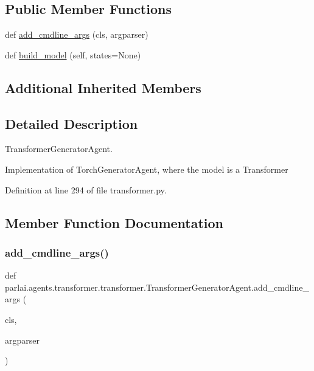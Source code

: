 \subsection*{Public Member Functions}
\begin{DoxyCompactItemize}
\item 
def \hyperlink{classparlai_1_1agents_1_1transformer_1_1transformer_1_1TransformerGeneratorAgent_a496b5ccc5efe17f290c37dc094ff74e8}{add\+\_\+cmdline\+\_\+args} (cls, argparser)
\item 
def \hyperlink{classparlai_1_1agents_1_1transformer_1_1transformer_1_1TransformerGeneratorAgent_a473f2a19d6bce412c4c9163c7beb9b09}{build\+\_\+model} (self, states=None)
\end{DoxyCompactItemize}
\subsection*{Additional Inherited Members}


\subsection{Detailed Description}
\begin{DoxyVerb}TransformerGeneratorAgent.

Implementation of TorchGeneratorAgent, where the model is a Transformer
\end{DoxyVerb}
 

Definition at line 294 of file transformer.\+py.



\subsection{Member Function Documentation}
\mbox{\label{classparlai_1_1agents_1_1transformer_1_1transformer_1_1TransformerGeneratorAgent_a496b5ccc5efe17f290c37dc094ff74e8}} 
\subsubsection{\texorpdfstring{add\+\_\+cmdline\+\_\+args()}{add\_cmdline\_args()}}
{\footnotesize\ttfamily def parlai.\+agents.\+transformer.\+transformer.\+Transformer\+Generator\+Agent.\+add\+\_\+cmdline\+\_\+args (\begin{DoxyParamCaption}\item[{}]{cls,  }\item[{}]{argparser }\end{DoxyParamCaption})}

